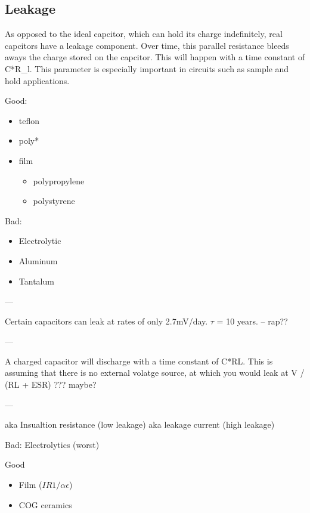\subsection{Leakage}

As opposed to the ideal capcitor, which can hold its charge indefinitely, real capcitors have a leakage component. Over time, this parallel resistance bleeds aways the charge stored on the capcitor. This will happen with a time constant of C*R\_l. This parameter is especially important in circuits such as sample and hold applications.
\cite{anal_capProps}

Good:
\begin{itemize}
    \item teflon
    \item poly*
    \cite{anal_capProps}
    \item film 
    \begin{itemize}
        \item polypropylene 
        \item polystyrene \cite[Sect.~3.6.7]{elec_inv}
    \end{itemize}
\end{itemize}
\cite{capSite_intro}

Bad:
\begin{itemize}
    \item Electrolytic
    \item Aluminum
    \item Tantalum
    \cite{anal_capProps}
    \cite[Sect.~3.6.7]{elec_inv}
\end{itemize}

---

Certain capacitors can leak at rates of only 2.7mV/day. $\tau$ = 10 years. -- rap??

---

A charged capacitor will discharge with a time constant of C*RL. \cite[Sect.~3.6.7]{elec_inv}
This is assuming that there is no external volatge source, at which you would leak at V / (RL + ESR) ??? maybe?

---

aka Insualtion resistance (low leakage)
aka leakage current (high leakage)

Bad:
Electrolytics (worst)

Good

\begin{itemize}
    \item Film ($IR 1/\alpha \epsilon$)    
    \item COG ceramics
\end{itemize}

